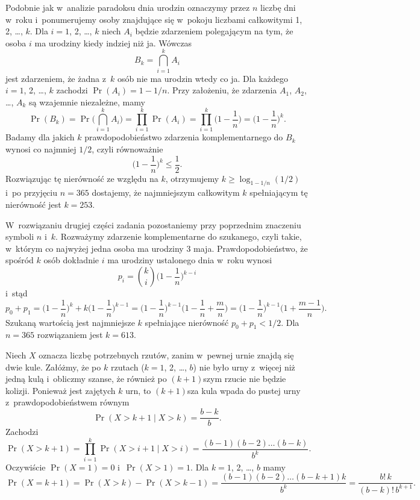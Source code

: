 
\exercise %
Podobnie jak w~analizie paradoksu dnia urodzin oznaczymy przez $n$ liczbę dni w~roku i~ponumerujemy osoby znajdujące się w~pokoju liczbami całkowitymi 1, 2, \dots, $k$.
Dla $i=1$, 2, \dots, $k$ niech $A_i$ będzie zdarzeniem polegającym na tym, że osoba $i$ ma urodziny kiedy indziej niż ja.
Wówczas
\[
	B_k = \bigcap_{i=1}^kA_i
\]
jest zdarzeniem, że żadna z~$k$ osób nie ma urodzin wtedy co ja.
Dla każdego $i=1$, 2, \dots, $k$ zachodzi $\Pr(A_i)=1-1/n$.
Przy założeniu, że zdarzenia $A_1$, $A_2$, \dots, $A_k$ są wzajemnie niezależne, mamy
\[
	\Pr(B_k) = \Pr\biggl(\bigcap_{i=1}^kA_i\biggr) = \prod_{i=1}^k\Pr(A_i) = \prod_{i=1}^k\biggl(1-\frac{1}{n}\biggr) = \biggl(1-\frac{1}{n}\biggr)^k.
\]
Badamy dla jakich $k$ prawdopodobieństwo zdarzenia komplementarnego do $B_k$ wynosi co najmniej $1/2$, czyli równoważnie
\[
	\biggl(1-\frac{1}{n}\biggr)^k \le \frac{1}{2}.
\]
Rozwiązując tę nierówność ze względu na $k$, otrzymujemy $k\ge\log_{1-1/n}(1/2)$ i~po przyjęciu $n=365$ dostajemy, że najmniejszym całkowitym $k$ spełniającym tę nierówność jest $k=253$.

W~rozwiązaniu drugiej części zadania pozostaniemy przy poprzednim znaczeniu symboli $n$ i~$k$.
Rozważymy zdarzenie komplementarne do szukanego, czyli takie, w~którym co najwyżej jedna osoba ma urodziny 3 maja.
Prawdopodobieństwo, że spośród $k$ osób dokładnie $i$ ma urodziny ustalonego dnia w~roku wynosi
\[
	p_i = \binom{k}{i}\biggl(1-\frac{1}{n}\biggr)^{k-i}
\]
i~stąd
\[
	p_0+p_1 = \biggl(1-\frac{1}{n}\biggr)^k\!+k\biggl(1-\frac{1}{n}\biggr)^{k-1}\!\! = \biggl(1-\frac{1}{n}\biggr)^{k-1}\!\biggl(1-\frac{1}{n}+\frac{m}{n}\biggr) = \biggl(1-\frac{1}{n}\biggr)^{k-1}\!\biggl(1+\frac{m-1}{n}\biggr).
\]
Szukaną wartością jest najmniejsze $k$ spełniające nierówność $p_0+p_1<1/2$.
Dla $n=365$ rozwiązaniem jest $k=613$.

\exercise %
Niech $X$ oznacza liczbę potrzebnych rzutów, zanim w~pewnej urnie znajdą się dwie kule.
Załóżmy, że po $k$ rzutach ($k=1$, 2, \dots, $b$) nie było urny z~więcej niż jedną kulą i~obliczmy szanse, że również po $(k+1)$\nbhyphen szym rzucie nie będzie kolizji.
Ponieważ jest zajętych $k$ urn, to $(k+1)$\nbhyphen sza kula wpada do pustej urny z~prawdopodobieństwem równym
\[
	\Pr(X>k+1\mid X>k) = \frac{b-k}{b}.
\]
Zachodzi
\[
	\Pr(X>k+1) = \prod_{i=1}^k\Pr(X>i+1\mid X>i) = \frac{(b-1)(b-2)\dots(b-k)}{b^k}.
\]
Oczywiście $\Pr(X=1)=0$ i~$\Pr(X>1)=1$.
Dla $k=1$, 2, \dots, $b$ mamy
\[
	\Pr(X=k+1) = \Pr(X>k)-\Pr(X>k-1) = \frac{(b-1)(b-2)\dots(b-k+1)k}{b^k} = \frac{b!\,k}{(b-k)!\,b^{k+1}}.
\]

